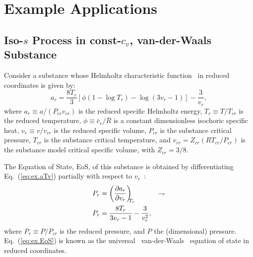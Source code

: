 \section{Example Applications}

    \subsection{Iso-$s$ Process in const-$c_v$, van-der-Waals Substance}

    Consider         a         substance         whose         Helmholtz          characteristic
    function~\cite{1986-JonesJB+HawkinsGA-Wiley} in reduced coordinates is given by:
    \begin{equation}
        a_r = \frac{8T_r}{3}\left[
                  \phi\left(1 - \log T_r\right) - \log(3v_r - 1)
              \right] - \frac{3}{v_r},
        \label{eq:ex.aTv}
    \end{equation}
    \noindent where $a_r \equiv a / (P_{cr}v_{cr})$ is the reduced  specific  Helmholtz  energy,
    $T_r \equiv T / T_{cr}$ is the reduced temperature, $\phi \equiv \bar{c}_v / \bar{R}$  is  a
    constant dimensionless isochoric specific heat, $v_r \equiv  v  /  v_{cr}$  is  the  reduced
    specific volume, $P_{cr}$ is the substance critical  pressure,  $T_{cr}$  is  the  substance
    critical temperature, and $v_{cr} = Z_{cr}(RT_{cr}/P_{cr})$ is the substance model  critical
    specific volume, with $Z_{cr} = 3/8$.

    The  Equation  of  State,  EoS,  of  this   substance   is   obtained   by   differentiating
    Eq.~(\ref{eq:ex.aTv}) partially with respect to $v_r$~\cite{1986-JonesJB+HawkinsGA-Wiley}:
    \begin{align}
        P_r & = \left(\frac{\partial {{a_r}}}{\partial {{v_r}}}\right)_{\!\!\!{T_r}} & \rightharpoondown\\
        P_r & = \frac{8T_r}{3v_r - 1} - \frac{3}{v_r^2}, \label{eq:ex.EoS}
    \end{align}
    \noindent where $P_r \equiv P / P_{cr}$ is the reduced pressure, and $P$  the  (dimensional)
    pressure. Eq.~(\ref{eq:ex.EoS}) is  known  as  the  universal~\cite{1899-MaxwellJC-Longmans}
    van-der-Waals~\cite{2006-BejanA-Wiley,                           2013-CengelYA+BolesMA-AMGH,
    1986-JonesJB+HawkinsGA-Wiley} equation of state in reduced coordinates.

